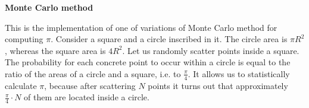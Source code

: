 \documentclass[12pt]{article}
\begin{document}
\begin{titlepage}
\begin{center}
	\LARGE\textbf{Monte Carlo method}
\end{center}
\large
This is the implementation of one of variations of Monte Carlo method for computing $\pi$. Consider a square and a circle inscribed in it. The circle area is $\pi{R}^2$, whereas the square area is $4{R}^2$. Let us randomly scatter points inside a square. The probability for each concrete point to occur within a circle is equal to the ratio of the areas of a circle and a square, i.e. \!\!to $\frac{\pi}{4}$. It allows us to statistically calculate $\pi$, because after scattering $N$ points it turns out that approximately $\frac{\pi}{4}\cdot N$ of them are located inside a circle.
\begin{flushleft}



\end{flushleft}
\end{titlepage}
\end{document}
